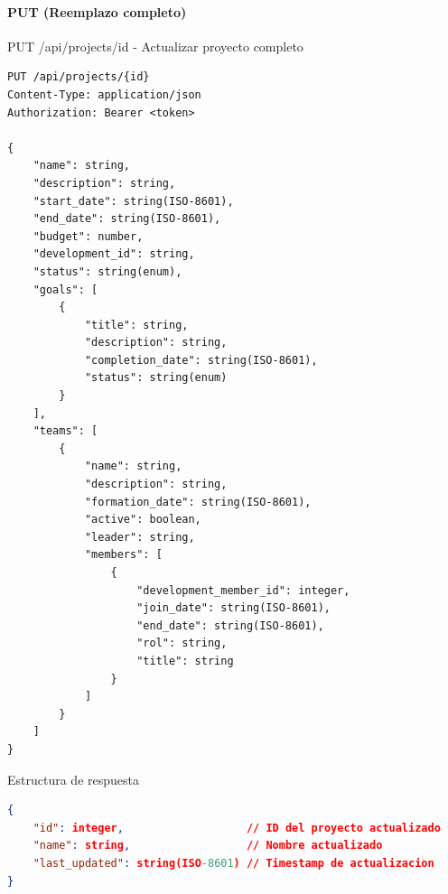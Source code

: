 \documentclass[11pt,a4paper]{article}
\begin{document}
\paragraph{PUT (Reemplazo completo)}
\begin{center}
	\begin{minipage}{\textwidth}
		\begin{codebox}{PUT /api/projects/{id} - Actualizar proyecto completo}
			\begin{lstlisting}[language=HTTP]
PUT /api/projects/{id}
Content-Type: application/json
Authorization: Bearer <token>

{
    "name": string,
    "description": string,
    "start_date": string(ISO-8601),
    "end_date": string(ISO-8601),
    "budget": number,
    "development_id": string,
    "status": string(enum),
    "goals": [
        {
            "title": string,
            "description": string,
            "completion_date": string(ISO-8601),
            "status": string(enum)
        }
    ],
    "teams": [
        {
            "name": string,
            "description": string,
            "formation_date": string(ISO-8601),
            "active": boolean,
            "leader": string,
            "members": [
                {
                    "development_member_id": integer,
                    "join_date": string(ISO-8601),
                    "end_date": string(ISO-8601),
                    "rol": string,
                    "title": string
                }
            ]
        }
    ]
}
\end{lstlisting}
		\end{codebox}
	\end{minipage}
\end{center}

\begin{center}
	\begin{minipage}{\textwidth}
		\begin{codebox}{Estructura de respuesta}
			\begin{lstlisting}[language=json]
{
    "id": integer,                   // ID del proyecto actualizado
    "name": string,                  // Nombre actualizado
    "last_updated": string(ISO-8601) // Timestamp de actualizacion
}
\end{lstlisting}
		\end{codebox}
	\end{minipage}
\end{center}
\end{document}
